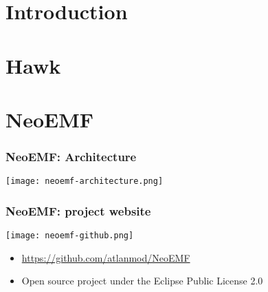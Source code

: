 



\maketitle

\section{Introduction}
\section{Hawk}

\section{NeoEMF}

\begin{frame}[t]\frametitle{NeoEMF: Architecture}
  \begin{center}
    \texttt{[image: neoemf-architecture.png]}
  \end{center}
\end{frame}

\begin{frame}[t]\frametitle{NeoEMF: project website}
  \begin{center}
    \texttt{[image: neoemf-github.png]}
  \end{center}
	
  \begin{itemize}
  \item \url{https://github.com/atlanmod/NeoEMF}
  \item Open source project under the Eclipse Public License 2.0
  \end{itemize}
\end{frame}

